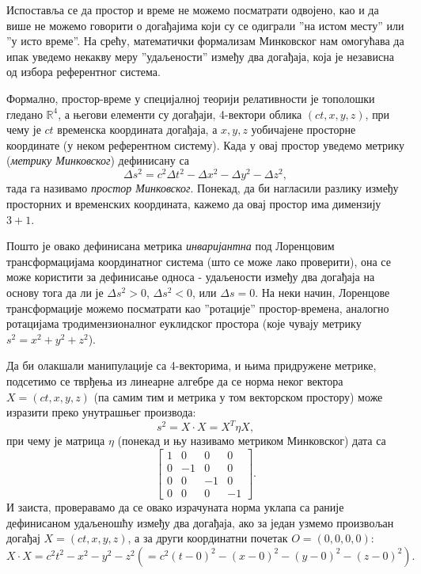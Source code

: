 \documentclass{report}
\theoremstyle{plain}
\theoremstyle{definition}
\begin{document}
Испоставља се да простор и време не можемо посматрати одвојено, као и да више не можемо говорити о догађајима који су се одиграли ''на истом месту'' или ''у исто време''. На срећу, математички формализам Минковског нам омогућава да ипак уведемо некакву меру ''удаљености'' између два догађаја, која је независна од избора референтног система.

Формално, простор-време у специјалној теорији релативности је тополошки гледано $\mathbb{R}^4$, а његови елементи су догађаји, 4-вектори облика $(ct, x, y, z)$, при чему је $ct$ временска координата догађаја, а $x, y, z$ уобичајене просторне координате (у неком референтном систему). Када у овај простор уведемо метрику (\emph{метрику Минковског}) дефинисану са
$$\Delta s^2 = c^2\Delta t^2 - \Delta x^2 - \Delta y^2 - \Delta z^2,$$
тада га називамо \emph{простор Минковског}. Понекад, да би нагласили разлику између просторних и временских координата, кажемо да овај простор има димензију $3+1$.

Пошто је овако дефинисана метрика \emph{инваријантна} под Лоренцовим трансформацијама координатног система (што се може лако проверити), она се може користити за дефинисање односа - удаљености између два догађаја на основу тога да ли је $\Delta s^2>0$, $\Delta s^2 <0$, или $\Delta s = 0$. На неки начин, Лоренцове трансформације можемо посматрати као ''ротације'' простор-времена, аналогно ротацијама тродимензионалног еуклидског простора (које чувају метрику $s^2 = x^2+y^2+z^2$).

Да би олакшали манипулације са 4-векторима, и њима придружене метрике, подсетимо се тврђења из линеарне алгебре да се норма неког вектора $X = (ct, x, y, z)$ (па самим тим и метрика у том векторском простору) може изразити преко унутрашњег производа:
$$s^2 = X\cdot X = X^T\eta X,$$
при чему је матрица $\eta$ (понекад и њу називамо метриком Минковског) дата са
$$\begin{bmatrix}
    1 &  0 &  0 &  0\\
    0 & -1 &  0 &  0\\
    0 &  0 & -1 &  0\\
    0 &  0 &  0 & -1
  \end{bmatrix}.$$
И заиста, проверавамо да се овако израчуната норма уклапа са раније дефинисаном удаљеношћу између два догађаја, ако за један узмемо произвољан догађај $X = (ct, x, y, z)$, а за други координатни почетак $O = (0, 0, 0, 0)$:
$$X\cdot X = c^2t^2 - x^2 - y^2 - z^2 (= c^2(t-0)^2 - (x-0)^2 - (y-0)^2 - (z-0)^2).$$
\end{document}
